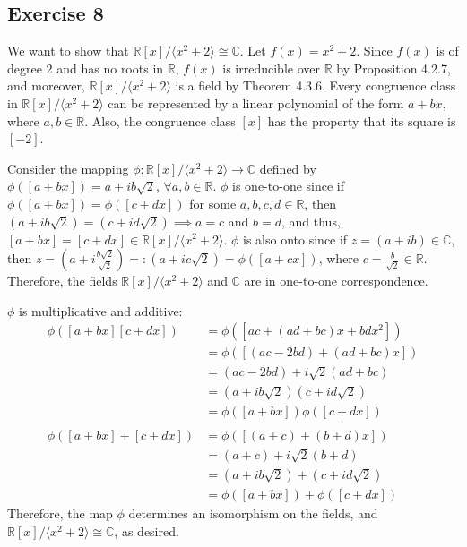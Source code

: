 \subsection*{Exercise 8}
We want to show that $\mathbb{R}[x]/\langle x^2 + 2\rangle \cong \mathbb{C}$. Let $f(x) = x^2 + 2$. Since $f(x)$ is of degree 2 and has no roots in $\mathbb{R}$, $f(x)$ is irreducible over $\mathbb{R}$ by Proposition 4.2.7, and moreover, $\mathbb{R}[x]/\langle x^2 + 2\rangle$ is a field by Theorem 4.3.6. Every congruence class in $\mathbb{R}[x]/\langle x^2 + 2\rangle$ can be represented by a linear polynomial of the form $a + bx$, where $a,b \in \mathbb{R}$. Also, the congruence class $[x]$ has the property that its square is $[-2]$.

Consider the mapping $\phi: \mathbb{R}[x]/\langle x^2 + 2\rangle \rightarrow \mathbb{C}$ defined by $\phi([a + bx]) = a + ib\sqrt{2}$, $\forall a,b \in \mathbb{R}$. $\phi$ is one-to-one since if $\phi([a + bx]) = \phi([c + dx])$ for some $a,b,c,d \in \mathbb{R}$, then $(a + ib\sqrt{2}) = (c + id\sqrt{2}) \implies a=c$ and $b=d$, and thus, $[a + bx] = [c + dx] \in \mathbb{R}[x]/\langle x^2 + 2\rangle$. $\phi$ is also onto since if $z = (a + ib) \in \mathbb{C}$, then $z = (a + i\frac{b\sqrt{2}}{\sqrt{2}}) =: (a + ic\sqrt{2}) = \phi([a + cx])$, where $c = \frac{b}{\sqrt{2}} \in \mathbb{R}$. Therefore, the fields $\mathbb{R}[x]/\langle x^2 + 2\rangle$ and $\mathbb{C}$ are in one-to-one correspondence.

$\phi$ is multiplicative and additive:
\begin{align*}
    \phi([a+bx][c+dx]) &= \phi([ac+(ad+bc)x+bdx^2]) \\
    &= \phi([(ac-2bd)+(ad+bc)x]) \\
    &= (ac-2bd) + i\sqrt{2}(ad + bc) \\
    &= (a + ib\sqrt{2})(c + id\sqrt{2}) \\
    &= \phi([a+bx])\phi([c+dx]) \\
    & \\
    \phi([a+bx]+[c+dx]) &= \phi([(a+c)+(b+d)x]) \\
    &= (a+c) + i\sqrt{2}(b+d) \\
    &= (a + ib\sqrt{2})+(c + id\sqrt{2}) \\
    &= \phi([a+bx])+\phi([c+dx])
\end{align*}
Therefore, the map $\phi$ determines an isomorphism on the fields, and $\mathbb{R}[x]/\langle x^2 + 2\rangle \cong \mathbb{C}$, as desired.